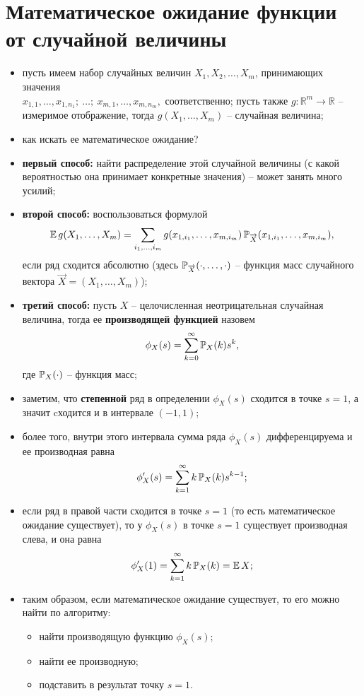 \section*{Математическое ожидание функции от случайной величины}
\begin{itemize}
    \item
    пусть имеем набор случайных величин $X_1, X_2, \ldots, X_m$, принимающих значения\\
    $x_{1, 1}, \ldots, x_{1, n_1};\ \ldots;\ x_{m, 1}, \ldots, x_{m, n_m},$ соответственно;
    пусть также $g: \mathbb{R}^m \rightarrow \mathbb{R}$ -- измеримое отображение, тогда $g(X_1, \ldots, X_m)$ -- случайная величина;
    \item
    как искать ее математическое ожидание?
    \item
    \textbf{первый способ:} найти распределение этой случайной величины (с какой вероятностью она принимает конкретные значения) -- может занять много усилий;
    \item
    \textbf{второй способ:} воспользоваться формулой
    \[
        \operatorname{\mathbb{E}} g(X_1, \ldots, X_m) = \sum_{i_1, \ldots, i_m} g(x_{1, i_1}, \ldots, x_{m, i_m}) \operatorname{\mathbb{P}}_{\overrightarrow{X}}(x_{1, i_1}, \ldots, x_{m, i_m}),
    \]
    если ряд сходится абсолютно (здесь $\operatorname{\mathbb{P}}_{\overrightarrow{X}}(\cdot, \ldots, \cdot)$ -- функция масс случайного вектора $\overrightarrow{X} = (X_1, \ldots, X_m)$);
    \item
    \textbf{третий способ:} пусть $X$ -- целочисленная неотрицательная случайная величина, тогда ее \textbf{производящей функцией} назовем
    \[
        \phi_X(s) = \sum_{k = 0}^{\infty} \operatorname{\mathbb{P}}_X(k) s^k,
    \]
    где $\operatorname{\mathbb{P}}_X(\cdot)$ -- функция масс;
    \item
    заметим, что \textbf{степенной} ряд в определении $\phi_X(s)$ сходится в точке $s = 1$, а значит cходится и в интервале $(-1, 1)$;
    \item
    более того, внутри этого интервала сумма ряда $\phi_X(s)$ дифференцируема и ее производная равна
    \[
        \phi'_X(s) = \sum_{k = 1}^{\infty} k \operatorname{\mathbb{P}}_X(k) s^{k - 1};
    \]
    \item
    если ряд в правой части сходится в точке $s = 1$ (то есть математическое ожидание существует), то у $\phi_X(s)$ в точке $s = 1$ существует производная слева, и она равна 
    \[
        \phi_X'(1) = \sum_{k = 1}^{\infty} k \operatorname{\mathbb{P}}_X(k) = \operatorname{\mathbb{E}} X;
    \]
    \item
    таким образом, если математическое ожидание существует, то его можно найти по алгоритму:
    \begin{itemize}
        \item
        найти производящую функцию $\phi_X(s)$;
        \item
        найти ее производную;
        \item
        подставить в результат точку $s = 1$.
    \end{itemize}
\end{itemize}

